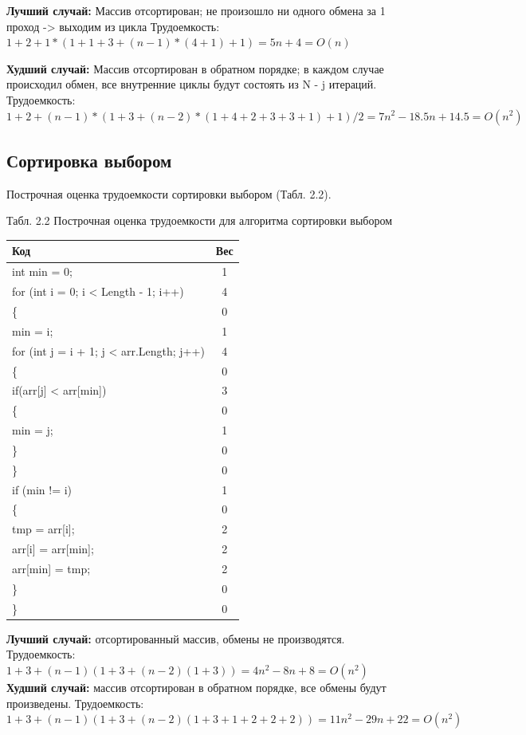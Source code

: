 \documentclass[12pt]{report}
\begin{document}
 
\textbf{Лучший случай:} Массив отсортирован; не произошло ни одного обмена за 1 проход -> выходим из цикла \newline
Трудоемкость:  $1 + 2 + 1 * (1 + 1 + 3 + (n - 1) * (4 + 1) + 1) = 5n + 4 = O(n)$

\textbf{Худший случай:}  Массив отсортирован в обратном порядке; в каждом случае происходил обмен, все внутренние циклы будут состоять из N - j итераций.\newline
Трудоемкость: $1 + 2 + (n - 1) * (1 + 3 + (n - 2) * (1 + 4 + 2 + 3 + 3 + 1) + 1) / 2 = 7n^2 - 18.5n + 14.5 = O(n ^ 2)$
\newline
\newline
\newline
\subsection{Сортировка выбором}
Построчная оценка трудоемкости сортировки выбором (Табл. 2.2).
\begin{center}
Табл. 2.2 Построчная оценка трудоемкости для алгоритма сортировки выбором

	\begin{tabular}{|l c|} 
 	\hline
	Код & Вес \\ [0.5ex] 
 	\hline
 	int min = 0; & 1\\
 	\hline
	for (int i = 0; i < Length - 1; i++) & 4\\
	\hline
	\{ & 0\\
	\hline
	min = i; & 1\\
 	\hline
	for (int j = i + 1; j < arr.Length; j++) & 4\\
	\hline
	\{ & 0\\	
	\hline
	if(arr[j] < arr[min]) & 3\\
	\hline
	\{ & 0\\
    \hline
    min = j; & 1\\
    \hline
    \} & 0\\
	\hline
	\} & 0\\
	\hline
	if (min != i) & 1\\
	\hline
	\{ & 0\\
	\hline
	tmp = arr[i]; & 2\\
	\hline
    arr[i] = arr[min]; & 2\\
    \hline
    arr[min] = tmp; & 2\\
    \hline
	\} & 0\\
	\hline
	\} & 0\\
	\hline
	\end{tabular}
\end{center}
\hspace*{5mm}
\textbf{Лучший случай:} отсортированный массив, обмены не производятся.
\newline
Трудоемкость: $1 + 3 + (n - 1)(1 + 3 + (n - 2)(1 + 3)) = 4n^2 - 8n + 8 = O(n^2)$
\newline
\hspace*{5mm}
\textbf{Худший случай:} массив отсортирован в обратном порядке, все обмены будут произведены. \newline
Трудоемкость: $1 + 3 + (n - 1)(1 + 3 + (n - 2)(1 + 3 + 1 + 2 + 2 + 2)) = 11n^2 - 29n + 22 = O(n^2)$
\end{document}
